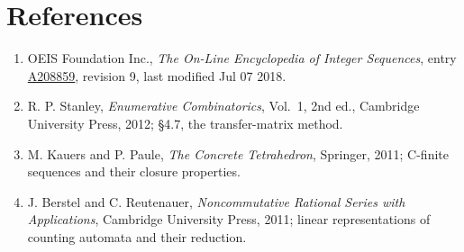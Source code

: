 \documentclass[11pt]{article}
\theoremstyle{definition}
\begin{document}
\section{References}

\begin{enumerate}

\item OEIS Foundation Inc., \emph{The On-Line Encyclopedia of Integer Sequences}, entry \href{https://oeis.org/A208859}{A208859}, revision 9, last modified Jul 07 2018.

\item R. P. Stanley, \emph{Enumerative Combinatorics}, Vol.~1, 2nd ed., Cambridge University Press, 2012; \S4.7, the transfer-matrix method.

\item M. Kauers and P. Paule, \emph{The Concrete Tetrahedron}, Springer, 2011; C-finite sequences and their closure properties.

\item J. Berstel and C. Reutenauer, \emph{Noncommutative Rational Series with Applications}, Cambridge University Press, 2011; linear representations of counting automata and their reduction.

\end{enumerate}
\end{document}
